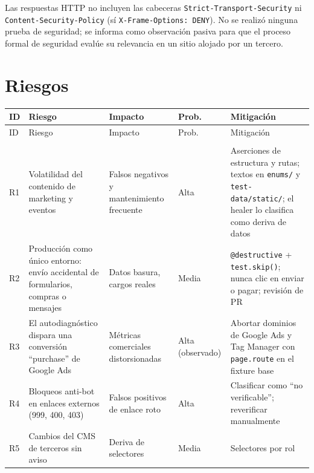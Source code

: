 \documentclass[11pt,a4paper]{article}
\newcommand{\code}[1]{\texttt{#1}}
\begin{document}
\begin{warnbox}
Las respuestas HTTP no incluyen las cabeceras \code{Strict-Transport-Security} ni
\code{Content-Security-Policy} (sí \code{X-Frame-Options: DENY}). No se realizó ninguna
prueba de seguridad; se informa como observación pasiva para que el proceso formal de
seguridad evalúe su relevancia en un sitio alojado por un tercero.
\end{warnbox}

\clearpage
\section{Riesgos}

{\small
\setlength{\tabcolsep}{4pt}
\begin{longtable}{@{}>{\raggedright\arraybackslash}p{0.7cm}
  >{\raggedright\arraybackslash}p{4.2cm}
  >{\raggedright\arraybackslash}p{3.2cm}
  >{\raggedright\arraybackslash}p{1.8cm}
  >{\raggedright\arraybackslash}p{5.4cm}@{}}
\toprule
ID & Riesgo & Impacto & Prob. & Mitigación \\
\midrule
\endfirsthead
\toprule
ID & Riesgo & Impacto & Prob. & Mitigación \\
\midrule
\endhead
\midrule
\multicolumn{5}{r}{\footnotesize\color{muted}Continúa en la página siguiente}\\
\endfoot
\bottomrule
\endlastfoot
R1 & Volatilidad del contenido de marketing y eventos & Falsos negativos y mantenimiento
  frecuente & Alta & Aserciones de estructura y rutas; textos en \code{enums/} y
  \code{test-data/static/}; el healer lo clasifica como deriva de datos \\
R2 & Producción como único entorno: envío accidental de formularios, compras o mensajes &
  Datos basura, cargos reales & Media & \code{@destructive} + \code{test.skip()}; nunca clic
  en enviar o pagar; revisión de PR \\
R3 & El autodiagnóstico dispara una conversión ``purchase'' de Google Ads & Métricas
  comerciales distorsionadas & Alta (observado) & Abortar dominios de Google Ads y Tag Manager
  con \code{page.route} en el fixture base \\
R4 & Bloqueos anti-bot en enlaces externos (999, 400, 403) & Falsos positivos de enlace roto
  & Alta & Clasificar como ``no verificable''; reverificar manualmente \\
R5 & Cambios del CMS de terceros sin aviso & Deriva de selectores & Media & Selectores por rol

\end{longtable}}
\end{document}
